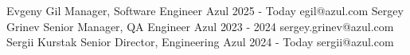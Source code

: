 
\begin{referees}
        {Evgeny Gil}
        {Manager, Software Engineer}
        {Azul} {2025 - Today}
        {egil@azul.com}
        {Sergey Grinev}
        {Senior Manager, QA Engineer}
        {Azul} {2023 - 2024}
        {sergey.grinev@azul.com}
        {Sergii Kurstak}
        {Senior Director, Engineering}
        {Azul} {2024 - Today}
        {sergii@azul.com}
\end{referees}